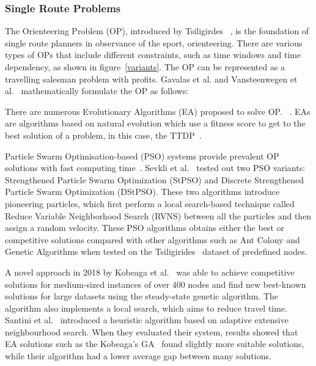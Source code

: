 \subsubsection{Single Route Problems}

The Orienteering Problem (OP), introduced by Tsiligirdes
~\cite{Tsiligirides1984}, is the foundation of
single route planners in observance of the sport, orienteering. There are
various types of OPs that include different constraints, such as time windows
and time dependency, as shown in figure~\ref{variants}. The OP can be represented as a
travelling salesman problem with profits. Gavalas et al. 
and Vansteenwegen et al.~\cite{Gavalas2014a, Vansteenwegen2011b}
mathematically formulate the OP as follows:

%

There are numerous Evolutionary Algorithms (EA) proposed to solve OP.\@
~\cite{Kobeaga2018,Wang2008}. EAs are algorithms based on natural evolution which
use a fitness score to get to the best solution of a problem, in this case, the
TTDP~\cite{Gunawan2016}.



Particle Swarm Optimisation-based (PSO) systems provide prevalent OP solutions
with fast computing time~\cite{Yu2019}.  Sevkli
et al.~\cite{Sevkli2010,Sevkli2010a} tested out two PSO variants:
Strengthened Particle Swarm Optimization (StPSO) and Discrete Strengthened
Particle Swarm Optimization (DStPSO). These two algorithms introduce pioneering
particles, which first perform a local search-based technique called Reduce
Variable Neighborhood Search (RVNS) between all the particles and then assign a
random velocity. These PSO algorithms obtains either the best or competitive
solutions compared with other algorithms such as Ant Colony and Genetic
Algorithms when tested on the Tsiligirides~\cite{Tsiligirides1984, Chen2011a}
dataset of predefined nodes.

A novel approach in 2018  by Kobeaga et al.~\cite{Kobeaga2018} was able to
achieve competitive solutions for medium-sized instances of over 400 nodes and
find new best-known solutions for large datasets using the steady-state genetic
algorithm. The algorithm also implements a local search, which aims to reduce
travel time. Santini et al.~\cite{Santini2019} introduced a heuristic algorithm
based on adaptive extensive neighbourhood search. When they evaluated their
system, results showed that EA solutions such as the Kobeaga's GA~\cite{Kobeaga2018} found slightly more suitable
solutions, while their algorithm had a lower average gap between many
solutions.

